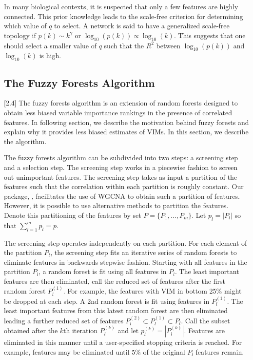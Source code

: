 \documentclass[article,shortnames]{jss}
\begin{document}
In many biological contexts, it is suspected that only a few features are highly connected.  This prior knowledge leads to the scale-free criterion for
determining which value of $q$ to select.  A network is said to have a generalized scale-free topology if $p(k) \sim k^{\gamma}$ or
 $\log_{10}(p(k)) \propto \log_{10}(k)$\citep{zhang2005general}.  This suggests that one should select a smaller value of $q$ such that the $R^{2}$ between 
  $\log_{10}(p(k))$ and $\log_{10}(k)$ is high.
  
\subsection{The Fuzzy Forests Algorithm}[2.4]
The fuzzy forests algorithm is an extension of random forests designed to obtain less biased variable importance rankings in the presence
of correlated features.  In following section, we describe the motivation behind fuzzy forests and explain why it
provides less biased estimates of VIMs.  In this section, we describe the algorithm.

The fuzzy forests algorithm can be subdivided into two steps: a screening step and a selection step.  The screening step works in a piecewise fashion
to screen out unimportant features.  The screening step takes as input a partition of the features such that the correlation within each partition is 
roughly constant.  Our package, , facilitates the use of WGCNA to obtain such a partition of features.  However, 
it is possible to use alternative methods to partition the features.  Denote this partitioning of the features by set $P=\{P_{1},\ldots,P_{m}\}$.
Let $p_{l}=|P_{l}|$ so that $\sum_{l=1}^{m}p_{l}=p$.

The screening step operates independently on each partition.  For each element of the partition $P_{l}$, the screening step fits an iterative series of
random forests to eliminate features in backwards stepwise fashion.  Starting with all features in the partition $P_{l}$, a random forest is fit using all
features in $P_{l}$.  The least important features are then eliminated, call the reduced set of features after the first random forest $P_{l}^{(1)}$.  
For example, the features with VIM in bottom 25\% might be dropped at each step. 
A 2nd random forest is fit using features in $P_{l}^{(1)}$.  The least important features from this latest random forest are then eliminated leading a
further reduced set of features $P_{l}^{(2)} \subset P_{l}^{(1)} \subset P_{l}$.  Call the subset obtained after the $k$th iteration $P_{l}^{(k)}$ and let
$p^{(k)}_{l}=|P_{l}^{(k)}|$.
Features are eliminated in this manner until a user-specified 
stopping criteria is reached.  For example, features may be eliminated until 5\% of the original $P_{l}$ features remain.  
\end{document}
